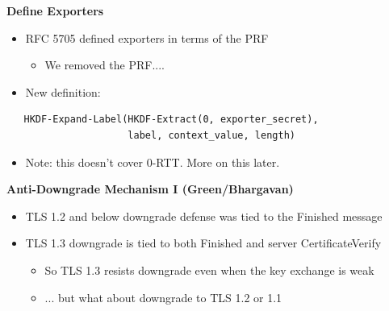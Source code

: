 \documentclass[helvetica]{seminar}
\newcommand{\heading}[1]{%
  \begin{center} 
    \large\bf 
    #1 
  \end{center} 
  \vspace{.4 in}}
\begin{document}
\begin{slide}
\heading{Define Exporters}

\begin{itemize}
\item RFC 5705 defined exporters in terms of the PRF
  \begin{itemize}
  \item We removed the PRF....
  \end{itemize}

\item New definition:
\end{itemize}


{\scriptsize
\begin{verbatim}
   HKDF-Expand-Label(HKDF-Extract(0, exporter_secret),
                     label, context_value, length)
\end{verbatim}
}

\begin{itemize}
\item Note: this doesn't cover 0-RTT. More on this later.
\end{itemize}
\end{slide}


\begin{slide}
\heading{Anti-Downgrade Mechanism I (Green/Bhargavan)}

\begin{itemize}
\item TLS 1.2 and below downgrade defense was tied to the Finished message
\item TLS 1.3 downgrade is tied to both Finished and server CertificateVerify
  \begin{itemize}
  \item So TLS 1.3 resists downgrade even when the key exchange is weak
  \item ... but what about downgrade to TLS 1.2 or 1.1
  \end{itemize}
\end{itemize}
\end{slide}
\end{document}

